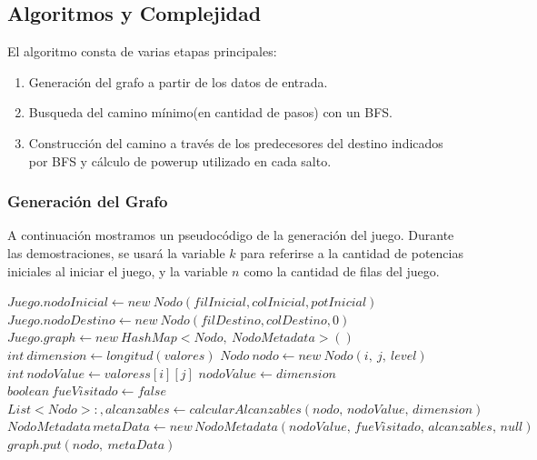 \subsection{Algoritmos y Complejidad} \label{ej_3:algoritmo}
El algoritmo consta de varias etapas principales:
\begin{enumerate}
	\item Generaci\'on del grafo a partir de los datos de entrada.
	\item Busqueda del camino m\'inimo(en cantidad de pasos) con un BFS.
	\item Construcci\'on del camino a trav\'es de los predecesores del destino indicados por BFS y
 			c\'alculo de powerup utilizado en cada salto.
 \end{enumerate}

 \subsubsection{Generaci\'on del Grafo}

A continuaci\'on mostramos un pseudoc\'odigo de la generaci\'on del juego. Durante las demostraciones, se usar\'a la variable $k$ para referirse a la cantidad de potencias iniciales al iniciar el juego, y la variable $n$ como la cantidad de filas del juego.
\vspace{2mm}
\begin{algorithmic}[1]
\Statex
	\State $Juego.nodoInicial \gets new \: Nodo(filInicial, colInicial, potInicial)$
	\State $Juego.nodoDestino \gets new \: Nodo(filDestino, colDestino, 0) $
	\State $Juego.graph \gets new \: HashMap<Nodo,\: NodoMetadata>()$
	\State $int \: dimension \gets longitud(valores)$
				\State	$Nodo \: nodo\gets new \: Nodo(i,\: j,\: level)$
				\State	$int\: nodoValue \gets valoress[i][j]$
					\State $nodoValue \gets dimension$
				\EndIf
				\State	$boolean \:fueVisitado \gets false$
				\State	$List<Nodo>:, alcanzables \gets calcularAlcanzables(nodo,\, nodoValue,\, dimension)$
				\State	$NodoMetadata \, metaData \gets new\, NodoMetadata(nodoValue,\, fueVisitado,\, alcanzables,\, null)$
				\State	$graph.put(nodo,\: metaData)$
			\EndFor
		\EndFor
	\EndFor

\EndProcedure
\Statex
\end{algorithmic}
\vspace{2mm}

